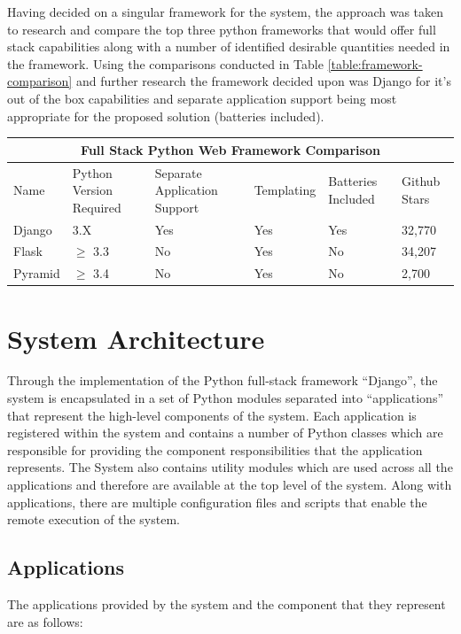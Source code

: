 \documentclass[11pt]{report}
\begin{document}
Having decided on a singular framework for the system, the approach was taken to research and compare the top three python frameworks that would offer full stack capabilities along with a number of identified desirable quantities needed in the framework. Using the comparisons conducted in Table \ref{table:framework-comparison} and further research the framework decided upon was Django for it's out of the box capabilities and separate application support being most appropriate for the proposed solution (batteries included).
\\

\begin{tabular}{ |p{1.5cm}||p{2cm}|p{2cm}|p{2cm}|p{1.75cm}|p{1.75cm}|  }
 \hline
 \multicolumn{6}{|c|}{Full Stack Python Web Framework Comparison} \\
 \hline
 Name & Python Version Required & Separate Application Support & Templating & Batteries Included & Github Stars\\
 \hline
 Django & 3.X    & Yes &   Yes & Yes & 32,770\\
 Flask &   $\geq$ 3.3  & No & Yes & No & 34,207\\
 Pyramid & $\geq$ 3.4 & No &  Yes &  No & 2,700\\
 \hline
\end{tabular}
\label{table:framework-comparison}

\section{System Architecture}
Through the implementation of the Python full-stack framework ``Django'', the system is encapsulated in a set of Python modules separated into ``applications'' that represent the high-level components of the system. Each application is registered within the system and contains a number of Python classes which are responsible for providing the component responsibilities that the application represents. The System also contains utility modules which are used across all the applications and therefore are available at the top level of the system. Along with applications, there are multiple configuration files and scripts that enable the remote execution of the system.

\subsection{Applications}
The applications provided by the system and the component that they represent are as follows:
\end{document}
